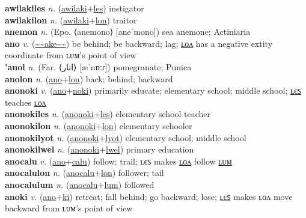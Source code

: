 \textbf{awilakiles} \textit{n.} (\hyperref[awilaki]{awilaki}+\hyperref[les]{les})
instigator \label{awilakiles} \\
\textbf{awilakilon} \textit{n.} (\hyperref[awilaki]{awilaki}+\hyperref[lon]{lon})
traitor \label{awilakilon} \\
\textbf{anemon} \textit{n.} (Epo. ⟨anemono⟩ [aneˈmono])
sea anemone; Actiniaria \label{anemon} \\
\textbf{ano} \textit{v.} (\hyperref[ake]{\~{}\~{}ake\~{}\~{}})
be behind; be backward; lag; \hyperref[anolon]{ʟᴏᴧ} has a negative 	extit{y} coordinate from ʟᴜᴍ's point of view \label{ano} \\
\textbf{'anol} \textit{n.} (Far. ⟨انار⟩ [æˈnɒːɾ])
pomegranate; Punica \label{'anol} \\
\textbf{anolon} \textit{n.} (\hyperref[ano]{ano}+\hyperref[lon]{lon})
back; behind; backward \label{anolon} \\
\textbf{anonoki} \textit{v.} (\hyperref[ano]{ano}+\hyperref[noki]{noki})
primarily educate; elementary school; middle school; \hyperref[anonokiles]{ʟєꜱ} teaches \hyperref[anonokilon]{ʟᴏᴧ} \label{anonoki} \\
\textbf{anonokiles} \textit{n.} (\hyperref[anonoki]{anonoki}+\hyperref[les]{les})
elementary school teacher \label{anonokiles} \\
\textbf{anonokilon} \textit{n.} (\hyperref[anonoki]{anonoki}+\hyperref[lon]{lon})
elementary schooler \label{anonokilon} \\
\textbf{anonokilyot} \textit{n.} (\hyperref[anonoki]{anonoki}+\hyperref[lyot]{lyot})
elementary school; middle school \label{anonokilyot} \\
\textbf{anonokilwel} \textit{n.} (\hyperref[anonoki]{anonoki}+\hyperref[lwel]{lwel})
primary education \label{anonokilwel} \\
\textbf{anocalu} \textit{v.} (\hyperref[ano]{ano}+\hyperref[calu]{calu})
follow; trail; ʟєꜱ makes \hyperref[anocalulon]{ʟᴏᴧ} follow \hyperref[anocalulum]{ʟᴜᴍ} \label{anocalu} \\
\textbf{anocalulon} \textit{n.} (\hyperref[anocalu]{anocalu}+\hyperref[lon]{lon})
follower; tail \label{anocalulon} \\
\textbf{anocalulum} \textit{n.} (\hyperref[anocalu]{anocalu}+\hyperref[lum]{lum})
followed \label{anocalulum} \\
\textbf{anoki} \textit{v.} (\hyperref[ano]{ano}+\hyperref[ki]{ki})
retreat; fall behind; go backward; lose; \hyperref[anokiles]{ʟєꜱ} makes ʟᴏᴧ move backward from ʟᴜᴍ's point of view \label{anoki} \\
